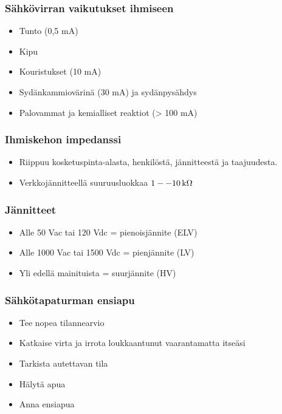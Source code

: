 \begin{frame}
\frametitle{Sähkövirran vaikutukset ihmiseen} %
\begin{itemize}
\item Tunto (0,5 mA)
\item Kipu
\item Kouristukset (10 mA)
\item Sydänkammiovärinä (30 mA) ja sydänpysähdys
\item Palovammat ja kemialliset reaktiot (> 100 mA)
\end{itemize}
\end{frame}

\begin{frame}
\frametitle{Ihmiskehon impedanssi}
\begin{itemize}
\item Riippuu kosketuspinta-alasta, henkilöstä, jännitteestä ja taajuudesta.
\item Verkkojännitteellä suuruusluokkaa $1--10\,\mathrm{k}\Omega$ %
\end{itemize}
\end{frame}

\begin{frame}
\frametitle{Jännitteet} %
\begin{itemize}
\item Alle 50 Vac tai 120 Vdc = pienoisjännite (ELV)
\item Alle 1000 Vac tai 1500 Vdc = pienjännite (LV)
\item Yli edellä mainituista = suurjännite (HV)
\end{itemize}
\end{frame}

\begin{frame}
\frametitle{Sähkötapaturman ensiapu} %
\begin{itemize}
\item Tee nopea tilannearvio
\item Katkaise virta ja irrota loukkaantunut vaarantamatta itseäsi
\item Tarkista autettavan tila
\item Hälytä apua
\item Anna ensiapua
\end{itemize}
\end{frame}


